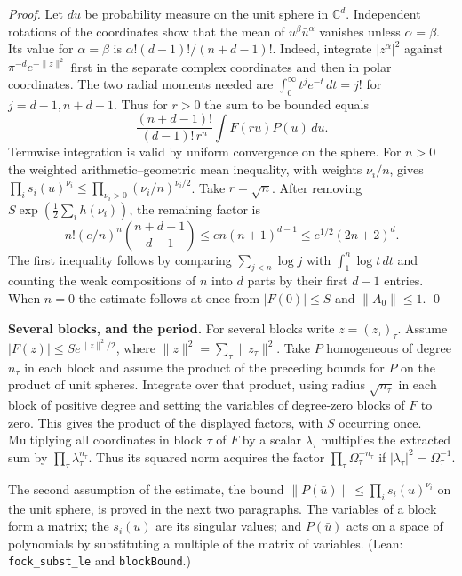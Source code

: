 \documentclass[11pt,letterpaper]{article}
\begin{document}
\emph{Proof.} Let $du$ be probability measure on the unit sphere in
$\mathbb C^d$. Independent rotations of the coordinates show that the mean
of $u^\beta\bar u^\alpha$ vanishes unless $\alpha=\beta$. Its value for
$\alpha=\beta$ is $\alpha!(d-1)!/(n+d-1)!$. Indeed, integrate
$|z^\alpha|^2$ against $\pi^{-d}e^{-\|z\|^2}$ first in the separate complex
coordinates and then in polar coordinates. The two radial moments needed
are $\int_0^\infty t^j e^{-t}\,dt=j!$ for $j=d-1,n+d-1$.
Thus for $r>0$ the sum to be bounded equals
\begin{equation}\label{D:149}
 \frac{(n+d-1)!}{(d-1)!\,r^n}\int F(ru) P(\bar u)\,du.
\end{equation}
Termwise integration is valid by uniform convergence on the sphere.
For $n>0$ the weighted arithmetic--geometric mean inequality, with weights
$\nu_i/n$, gives $\prod_i s_i(u)^{\nu_i}\le
\prod_{\nu_i>0}(\nu_i/n)^{\nu_i/2}$. Take $r=\sqrt n$.
After removing $S\exp(\frac12\sum_i h(\nu_i))$, the remaining factor is
\begin{equation}\label{D:150}
 n!(e/n)^n {n+d-1\choose d-1}
 \le en(n+1)^{d-1}\le e^{1/2}(2n+2)^d .
\end{equation}
The first inequality follows by comparing $\sum_{j<n}\log j$ with
$\int_1^n\log t\,dt$ and counting the weak compositions of $n$ into $d$
parts by their first $d-1$ entries. When $n=0$ the estimate follows at once
from $|F(0)|\le S$ and $\|A_0\|\le1$. \qed

\textbf{Several blocks, and the period.} For several blocks write $z=(z_\tau)_\tau$. Assume $|F(z)|\le S e^{\|z\|^2/2}$,
where $\|z\|^2=\sum_\tau\|z_\tau\|^2$. Take $P$ homogeneous of degree
$n_\tau$ in each block and assume the product of the preceding bounds for
$P$ on the product of unit spheres. Integrate over that product, using radius
$\sqrt{n_\tau}$ in each block of positive degree and setting the variables
of degree-zero blocks of $F$ to zero. This gives the product of the
displayed factors, with $S$ occurring once. Multiplying all coordinates
in block $\tau$ of $F$ by a scalar $\lambda_\tau$ multiplies the extracted
sum by $\prod_\tau\lambda_\tau^{n_\tau}$. Thus its squared norm acquires
the factor $\prod_\tau\Omega_\tau^{-n_\tau}$ if
$|\lambda_\tau|^2=\Omega_\tau^{-1}$.

The second assumption of the estimate, the bound $\|P(\bar u)\|\le\prod_is_i(u)^{\nu_i}$ on the unit sphere,
is proved in the next two paragraphs. The variables of a block form a matrix; the $s_i(u)$ are its singular
values; and $P(\bar u)$ acts on a space of polynomials by substituting a multiple of the matrix of
variables. (Lean: \texttt{fock\_subst\_le} and \texttt{blockBound}.)
\end{document}
